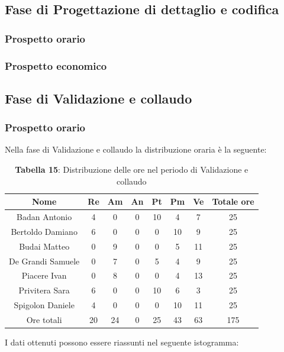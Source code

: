 \subsection{Fase di Progettazione di dettaglio e codifica}
\subsubsection{Prospetto orario}

\subsubsection{Prospetto economico}

\subsection{Fase di Validazione e collaudo}
\subsubsection{Prospetto orario}
Nella fase di Validazione e collaudo la distribuzione oraria è la seguente:

\begin{table}[H]
	\centering
	\renewcommand{\arraystretch}{1.5}
	\begin{tabular}{|c|c|c|c|c|c|c|c|}
		\hline
		\rowcolor{lighter-grayer}
		Nome & Re & Am & An & Pt & Pm & Ve & Totale ore\\
		\hline
		Badan Antonio & 4 & 0 & 0 &  10 & 4 & 7 & 25 \\
		\hline
		Bertoldo Damiano & 6 & 0 & 0 & 0 & 10 & 9 & 25 \\
		\hline
		Budai Matteo & 0 & 9 & 0 & 0 & 5 & 11 & 25 \\
		\hline
		De Grandi Samuele & 0 & 7 & 0 & 5 & 4 & 9 & 25 \\
		\hline
		Piacere Ivan & 0 & 8 & 0 & 0 & 4 & 13 & 25 \\
		\hline
		Privitera Sara & 6 & 0 & 0 & 10 & 6 & 3 & 25 \\
		\hline
		Spigolon Daniele & 4 & 0 & 0 & 0 & 10 & 11 & 25 \\
		\hline
		Ore totali & 20 & 24 & 0 & 25 & 43 & 63 & 175 \\
		\hline
	\end{tabular}
	\caption*{\textbf{Tabella 15}: Distribuzione delle ore nel periodo di Validazione e collaudo\\}
\end{table}	
	I dati ottenuti possono essere riassunti nel seguente istogramma:

